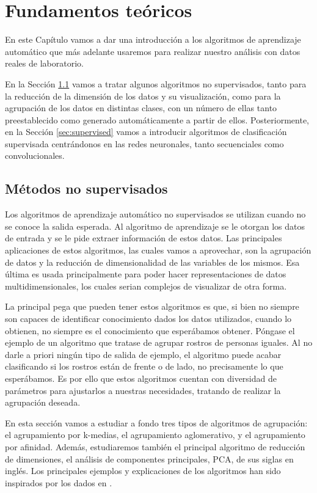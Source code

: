 \chapter{Fundamentos teóricos} \label{chap:fundamentos-teoricos}

En este Capítulo vamos a dar una introducción a los algoritmos de aprendizaje automático que más adelante usaremos para realizar nuestro análisis con datos reales de laboratorio.

En la Sección \ref{sec:unsupervised} vamos a tratar algunos algoritmos no supervisados, tanto para la reducción de la dimensión de los datos y su visualización, como para la agrupación de los datos en distintas clases, con un número de ellas tanto preestablecido como generado automáticamente a partir de ellos. Posteriormente, en la Sección \ref{sec:supervised} vamos a introducir algoritmos de clasificación supervisada centrándonos en las redes neuronales, tanto secuenciales como convolucionales.

\section{Métodos no supervisados}
\label{sec:unsupervised}

Los algoritmos de aprendizaje automático no supervisados se utilizan cuando no se conoce la salida esperada. Al algoritmo de aprendizaje se le otorgan los datos de entrada y se le pide extraer información de estos datos. Las principales aplicaciones de estos algoritmos, las cuales vamos a aprovechar, son la agrupación de datos y la reducción de dimensionalidad de las variables de los mismos. Esa última es usada principalmente para poder hacer representaciones de datos multidimensionales, los cuales serian complejos de visualizar de otra forma.

La principal pega que pueden tener estos algoritmos es que, si bien no siempre son capaces de identificar conocimiento dados los datos utilizados, cuando lo obtienen, no siempre es el conocimiento que esperábamos obtener. Póngase el ejemplo de un algoritmo que tratase de agrupar rostros de personas iguales. Al no darle a priori ningún tipo de salida de ejemplo, el algoritmo puede acabar clasificando si los rostros están de frente o de lado, no precisamente lo que esperábamos. Es por ello que estos algoritmos cuentan con diversidad de parámetros para ajustarlos a nuestras necesidades, tratando de realizar la agrupación deseada.

En esta sección vamos a estudiar a fondo tres tipos de algoritmos de agrupación: el agrupamiento por k-medias, el agrupamiento aglomerativo, y el agrupamiento por afinidad. Además, estudiaremos también el principal algoritmo de reducción de dimensiones, el análisis de componentes principales, PCA, de sus siglas en inglés. Los principales ejemplos y explicaciones de los algoritmos han sido inspirados por los dados en \cite{machine}.


